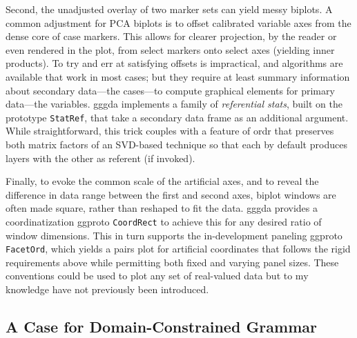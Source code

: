 \documentclass[
]{article}
\begin{document}
Second, the unadjusted overlay of two marker sets can yield messy
biplots. A common adjustment for PCA biplots is to offset calibrated
variable axes from the dense core of case markers. This allows for
clearer projection, by the reader or even rendered in the plot, from
select markers onto select axes (yielding inner products). To try and
err at satisfying offsets is impractical, and algorithms are available
that work in most cases; but they require at least summary information
about secondary data---the cases---to compute graphical elements for
primary data---the variables. \textsf{gggda} implements a family of
\emph{referential stats}, built on the prototype \texttt{StatRef}, that
take a secondary data frame as an additional argument. While
straightforward, this trick couples with a feature of \textsf{ordr} that
preserves both matrix factors of an SVD-based technique so that each by
default produces layers with the other as referent (if invoked).

Finally, to evoke the common scale of the artificial axes, and to reveal
the difference in data range between the first and second axes, biplot
windows are often made square, rather than reshaped to fit the data.
\textsf{gggda} provides a coordinatization ggproto \texttt{CoordRect} to
achieve this for any desired ratio of window dimensions. This in turn
supports the in-development paneling ggproto \texttt{FacetOrd}, which
yields a pairs plot for artificial coordinates that follows the rigid
requirements above while permitting both fixed and varying panel sizes.
These conventions could be used to plot any set of real-valued data but
to my knowledge have not previously been introduced.

\subsection{A Case for Domain-Constrained
Grammar}\label{a-case-for-domain-constrained-grammar}
\end{document}
